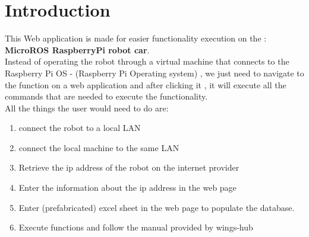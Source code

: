 %
%

\chapter{Introduction}
This Web application is made for easier functionality execution on the :\textbf{ MicroROS RaspberryPi robot car}.\\
Instead of operating the robot through a virtual machine that connects to the Raspberry Pi OS - (Raspberry Pi Operating system) , we just need to navigate to the function on a web application and after clicking it , it will execute all the commands that are needed to execute the functionality.\\
All the things the user would need to do are: 
\begin{enumerate}
	\item connect the robot to a local LAN
	\item connect the local machine to the same LAN
	\item Retrieve the ip address of the robot on the internet provider
	\item Enter the information about the ip address in the web page
	\item Enter (prefabricated) excel sheet in the web page to populate the database.
	\item Execute functions and follow the manual provided by wings-hub
\end{enumerate}







